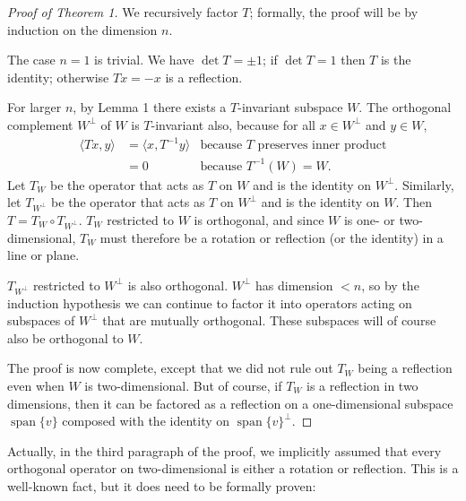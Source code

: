 \documentclass[12pt]{article}
\DeclareMathOperator{\linspan}{span}
\begin{document}
\begin{proof}[Proof of Theorem 1]
We recursively factor $T$; formally, the proof will be by induction on the dimension $n$.

The case $n=1$ is trivial.  We have $\det T = \pm 1$; if $\det T = 1$ then $T$ is the identity; otherwise $Tx = -x$ is a reflection.

For larger $n$, by Lemma 1 there exists a $T$-invariant subspace $W$.  The orthogonal complement $W^\perp$ of $W$ is $T$-invariant also, because
for all $x \in W^\perp$ and $y \in W$, 
\begin{align*}
\langle Tx, y \rangle &= \langle x, T^{-1} y \rangle & \textrm{because $T$ preserves inner product} \\
&= 0 & \textrm{because $T^{-1}(W) = W$.}
\end{align*}
Let $T_W$ be the operator that acts as $T$ on $W$ and is the identity on $W^\perp$.
Similarly, let $T_{W^\perp}$ be the operator that acts as $T$ on $W^{\perp}$
and is the identity on $W$.  Then $T = T_W \circ T_{W^\perp}$.
$T_W$ restricted to $W$ is orthogonal, and since $W$ is one- or two-dimensional,
$T_W$ must therefore be a rotation or reflection (or the identity) in a line or plane.

$T_{W^\perp}$ restricted to $W^\perp$ is also orthogonal. $W^\perp$ has dimension $<n$,
so by the induction hypothesis
we can continue to factor it into operators acting on subspaces of $W^\perp$ that are mutually orthogonal. These subspaces will of course also be orthogonal to $W$.

The proof is now complete, except that we did not rule out $T_W$ being a reflection even
when $W$ is two-dimensional.
But of course, if $T_W$ is a reflection in two dimensions,
then it can be factored as a reflection on a one-dimensional subspace $\linspan \{v\}$ 
composed with the identity on $\linspan \{ v \}^\perp$.
\end{proof}

Actually, in the third paragraph of the proof, we implicitly assumed that every orthogonal operator on two-dimensional is either a rotation or reflection.
This is a well-known fact, but it does need to be formally proven:
\end{document}
